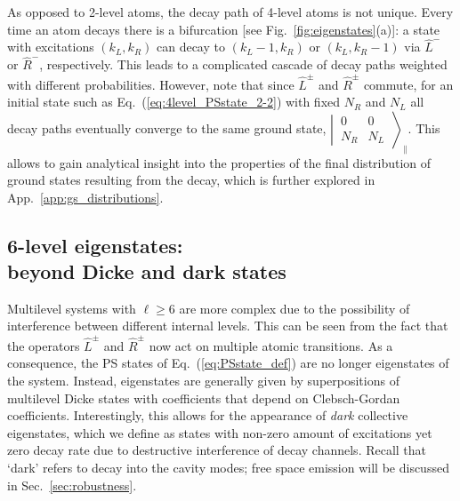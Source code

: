 \documentclass[aps,prx,superscriptaddress,twocolumn,notitlepage,nofootinbib,longbibliography]{revtex4-2}
\begin{document}
As opposed to 2-level atoms, the decay path of 4-level atoms is not unique. Every time an atom decays there is a bifurcation [see Fig.~\ref{fig:eigenstates}(a)]: a state with excitations $(k_L,k_R)$ can decay to $(k_L-1,k_R)$ or $(k_L,k_R-1)$ via $\hat{L}^-$ or $\hat{R}^-$, respectively.
This leads to a complicated cascade of decay paths weighted with different probabilities.
However, note that since $\hat{L}^\pm$ and $\hat{R}^\pm$ commute, for an initial state such as Eq.~(\ref{eq:4level_PSstate_2-2}) with fixed $N_R$ and $N_L$ all decay paths eventually converge to the same ground state, $\left|\, \begin{smallmatrix} 0 & 0 \\ N_R & N_L \end{smallmatrix} \,\right\rangle_\parallel $.
This allows to gain analytical insight into the properties of the final distribution of ground states resulting from the decay, which is further explored in App.~\ref{app:gs_distributions}.







\subsection{6-level eigenstates:\texorpdfstring{\\}{line} beyond Dicke and dark states\label{ssec:eigenstates_6l}}

Multilevel systems with $\ell\geq6$ are more complex due to the possibility of interference between different internal levels. This can be seen from the fact that the operators $\hat{L}^\pm$ and $\hat{R}^\pm$ now act on multiple atomic transitions.
As a consequence, the PS states of Eq.~(\ref{eq:PSstate_def}) are no longer eigenstates of the system.
Instead, eigenstates are generally given by superpositions of multilevel Dicke states with coefficients that depend on Clebsch-Gordan coefficients.
Interestingly, this allows for the appearance of \emph{dark} collective eigenstates, which we define as states with non-zero amount of excitations yet zero decay rate due to destructive interference of decay channels. Recall that `dark' refers to decay into the cavity modes; free space emission will be discussed in Sec.~\ref{sec:robustness}.
\end{document}
